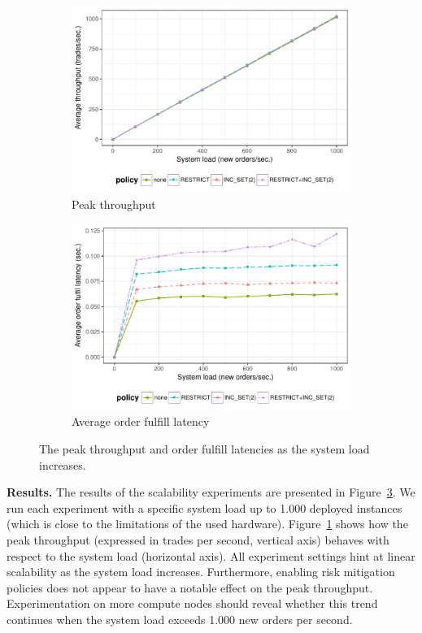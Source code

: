 \begin{figure}[t]
	\centering
	\begin{subfigure}[t]{.5\textwidth}
		\centering
		\captionsetup{width=.9\linewidth}
		\includegraphics[width=.95\linewidth]{xchange/assets/experiments/scalability}
		\caption{Peak throughput}
		\label{fig:scalability}
	\end{subfigure}%
	\begin{subfigure}[t]{.5\textwidth}
		\centering
		\captionsetup{width=.9\linewidth}
		\includegraphics[width=.95\linewidth]{xchange/assets/experiments/latency}
		\caption{Average order fulfill latency}
		\label{fig:latency}
	\end{subfigure}%
	\caption{The peak throughput and order fulfill latencies as the system load increases.}
	\label{fig:scalability_latency}
\end{figure}

\textbf{Results.}
The results of the scalability experiments are presented in Figure~\ref{fig:scalability_latency}.
We run each experiment with a specific system load up to 1.000 deployed instances (which is close to the limitations of the used hardware).
Figure~\ref{fig:scalability} shows how the peak throughput (expressed in trades per second, vertical axis) behaves with respect to the system load (horizontal axis).
All experiment settings hint at linear scalability as the system load increases.
Furthermore, enabling risk mitigation policies does not appear to have a notable effect on the peak throughput.
Experimentation on more compute nodes should reveal whether this trend continues when the system load exceeds 1.000 new orders per second.

